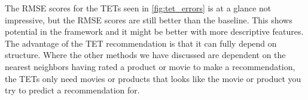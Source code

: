 The RMSE scores for the TETs seen in \autoref{fig:tet_errors} is at a glance not impressive, but the RMSE scores are still better than the baseline. 
This shows potential in the framework and it might be better with more descriptive features. The advantage of the TET recommendation is that it can fully depend on structure.
Where the other methods we have discussed are dependent on the nearest neighbors having rated a product or movie to make a recommendation, the TETs only need movies or products that looks like the movie or product you try to predict a recommendation for.

